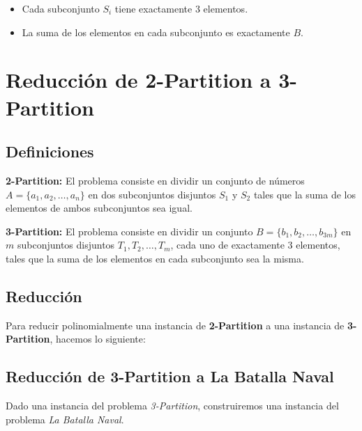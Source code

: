 \begin{itemize}
    \item Cada subconjunto \(S_i\) tiene exactamente 3 elementos.
    \item La suma de los elementos en cada subconjunto es exactamente \(B\).
\end{itemize}

\section*{Reducción de 2-Partition a 3-Partition}

\subsection*{Definiciones}

\textbf{2-Partition:} El problema consiste en dividir un conjunto de números \( A = \{a_1, a_2, \dots, a_n\} \) en dos subconjuntos disjuntos \( S_1 \) y \( S_2 \) tales que la suma de los elementos de ambos subconjuntos sea igual.

\textbf{3-Partition:} El problema consiste en dividir un conjunto \( B = \{b_1, b_2, \dots, b_{3m}\} \) en \( m \) subconjuntos disjuntos \( T_1, T_2, \dots, T_m \), cada uno de exactamente 3 elementos, tales que la suma de los elementos en cada subconjunto sea la misma.

\subsection*{Reducción}

Para reducir polinomialmente una instancia de \textbf{2-Partition} a una instancia de \textbf{3-Partition}, hacemos lo siguiente:


\subsection*{Reducción de 3-Partition a La Batalla Naval}

Dado una instancia del problema \textit{3-Partition}, construiremos una instancia del problema \textit{La Batalla Naval}.

